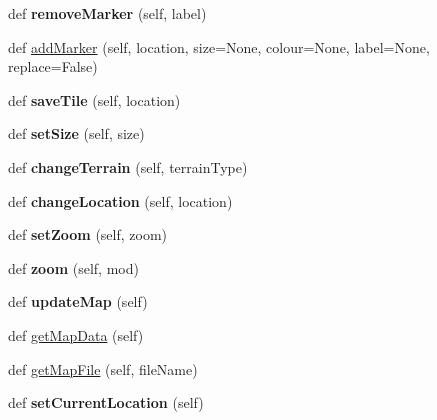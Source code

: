 \begin{DoxyCompactItemize}
def {\bfseries remove\+Marker} (self, label)
\item 
def \hyperlink{class_python_01_g_u_i_1_1appjar_1_1_google_map_a1d96cd8290a1082d0ada7811457def61}{add\+Marker} (self, location, size=None, colour=None, label=None, replace=False)
\item 
\mbox{\label{class_python_01_g_u_i_1_1appjar_1_1_google_map_ab5912ee45afbdda8fe8b886771eae1b3}} 
def {\bfseries save\+Tile} (self, location)
\item 
\mbox{\label{class_python_01_g_u_i_1_1appjar_1_1_google_map_a8422b9a0bb28e1d3dc3537d07b3f9401}} 
def {\bfseries set\+Size} (self, size)
\item 
\mbox{\label{class_python_01_g_u_i_1_1appjar_1_1_google_map_a4af276311b88ce8b2fb6d9a8827489c0}} 
def {\bfseries change\+Terrain} (self, terrain\+Type)
\item 
\mbox{\label{class_python_01_g_u_i_1_1appjar_1_1_google_map_ab7a9feca7fe1f7c0a39a26f5ba3332a9}} 
def {\bfseries change\+Location} (self, location)
\item 
\mbox{\label{class_python_01_g_u_i_1_1appjar_1_1_google_map_a1997462661f3287348eb00d3de069c20}} 
def {\bfseries set\+Zoom} (self, zoom)
\item 
\mbox{\label{class_python_01_g_u_i_1_1appjar_1_1_google_map_a42aa40d2c0f96d5592fe0ce4cdf2a1e3}} 
def {\bfseries zoom} (self, mod)
\item 
\mbox{\label{class_python_01_g_u_i_1_1appjar_1_1_google_map_a28e49a4c488f697bf887a984056b7edf}} 
def {\bfseries update\+Map} (self)
\item 
def \hyperlink{class_python_01_g_u_i_1_1appjar_1_1_google_map_a994ebfd2df12c300c180775ad6fcd83c}{get\+Map\+Data} (self)
\item 
def \hyperlink{class_python_01_g_u_i_1_1appjar_1_1_google_map_ab38acb7dfeef6d9a8370d00b39bc2c33}{get\+Map\+File} (self, file\+Name)
\item 
\mbox{\label{class_python_01_g_u_i_1_1appjar_1_1_google_map_aa6f760c8e2b3aec22f0e07e48c72cbc3}} 
def {\bfseries set\+Current\+Location} (self)
\end{DoxyCompactItemize}
